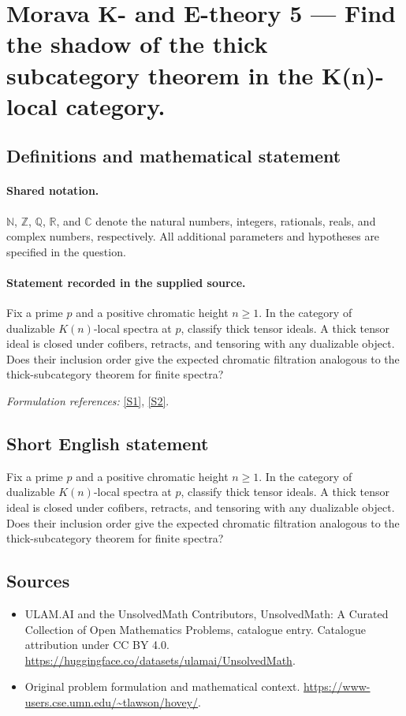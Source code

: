 \documentclass[11pt]{article}
\newcommand{\sref}[2]{\hyperlink{source:#1:#2}{[S#2]}}
\begin{document}
\section{Morava K- and E-theory 5 — Find the shadow of the thick subcategory theorem in the K(n)-local category.}\label{statement}

\subsection{Definitions and mathematical statement}

\paragraph{Shared notation.}$\mathbb N$, $\mathbb Z$, $\mathbb Q$, $\mathbb R$, and $\mathbb C$ denote the natural numbers, integers, rationals, reals, and complex numbers, respectively. All additional parameters and hypotheses are specified in the question.


\paragraph{Statement recorded in the supplied source.}
Fix a prime $p$ and a positive chromatic height $n\ge1$. In the category of dualizable $K(n)$-local spectra at $p$, classify thick tensor ideals. A thick tensor ideal is closed under cofibers, retracts, and tensoring with any dualizable object. Does their inclusion order give the expected chromatic filtration analogous to the thick-subcategory theorem for finite spectra?
\par\smallskip\textit{Formulation references:} \sref{statement}{1}, \sref{statement}{2}.
\subsection{Short English statement}
Fix a prime $p$ and a positive chromatic height $n\ge1$. In the category of dualizable $K(n)$-local spectra at $p$, classify thick tensor ideals. A thick tensor ideal is closed under cofibers, retracts, and tensoring with any dualizable object. Does their inclusion order give the expected chromatic filtration analogous to the thick-subcategory theorem for finite spectra?
\subsection{Sources}
\begin{itemize}
\item[\hypertarget{source:statement:1}{S1}] ULAM.AI and the UnsolvedMath Contributors, UnsolvedMath: A Curated Collection of Open Mathematics Problems, catalogue entry. Catalogue attribution under CC BY 4.0.
\url{https://huggingface.co/datasets/ulamai/UnsolvedMath}.
\item[\hypertarget{source:statement:2}{S2}] Original problem formulation and mathematical context.
\url{https://www-users.cse.umn.edu/~tlawson/hovey/}.
\end{itemize}
\label{end:statement}
\end{document}
